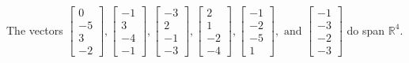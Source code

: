 \begin{exercise}
\begin{exerciseStatement}
  \end{exerciseStatement}
  \begin{exerciseAnswer}
   The vectors \(\left[\begin{array}{r}
0 \\
-5 \\
3 \\
-2
\end{array}\right] , \left[\begin{array}{r}
-1 \\
3 \\
-4 \\
-1
\end{array}\right] , \left[\begin{array}{r}
-3 \\
2 \\
-1 \\
-3
\end{array}\right] , \left[\begin{array}{r}
2 \\
1 \\
-2 \\
-4
\end{array}\right] , \left[\begin{array}{r}
-1 \\
-2 \\
-5 \\
1
\end{array}\right] , \text{ and } \left[\begin{array}{r}
-1 \\
-3 \\
-2 \\
-3
\end{array}\right]\) 
  	 do  
	span \(\mathbb{R}^4\).
  


  \end{exerciseAnswer}
\end{exercise}